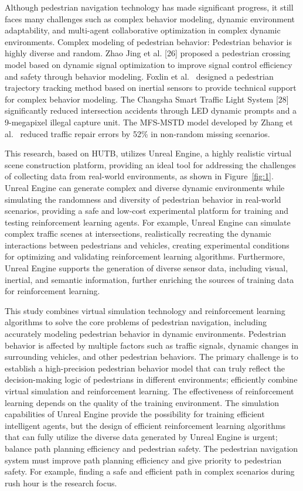 \documentclass[lettersize,journal]{IEEEtran}
\begin{document}
Although pedestrian navigation technology has made significant progress, it still faces many challenges such as complex behavior modeling, dynamic environment adaptability, and multi-agent collaborative optimization in complex dynamic environments.
%
Complex modeling of pedestrian behavior: Pedestrian behavior is highly diverse and random. 
Zhao Jing et al. [26] proposed a pedestrian crossing model based on dynamic signal optimization to improve signal control efficiency and safety through behavior modeling. 
Foxlin et al.~\cite{foxlin2005pedestrian} designed a pedestrian trajectory tracking method based on inertial sensors to provide technical support for complex behavior modeling. 
The Changsha Smart Traffic Light System [28] significantly reduced intersection accidents through LED dynamic prompts and a 9-megapixel illegal capture unit. 
The MFS-MSTD model developed by Zhang et al.~\cite{jiyu2024joint} reduced traffic repair errors by 52\% in non-random missing scenarios.



This research, based on HUTB, utilizes Unreal Engine, a highly realistic virtual scene construction platform, providing an ideal tool for addressing the challenges of collecting data from real-world environments, as shown in Figure~\ref{fig:1}. 
Unreal Engine can generate complex and diverse dynamic environments while simulating the randomness and diversity of pedestrian behavior in real-world scenarios, providing a safe and low-cost experimental platform for training and testing reinforcement learning agents. 
For example, Unreal Engine can simulate complex traffic scenes at intersections, realistically recreating the dynamic interactions between pedestrians and vehicles, creating experimental conditions for optimizing and validating reinforcement learning algorithms. 
Furthermore, Unreal Engine supports the generation of diverse sensor data, including visual, inertial, and semantic information, further enriching the sources of training data for reinforcement learning.


This study combines virtual simulation technology and reinforcement learning algorithms to solve the core problems of pedestrian navigation, including accurately modeling pedestrian behavior in dynamic environments. 
Pedestrian behavior is affected by multiple factors such as traffic signals, dynamic changes in surrounding vehicles, and other pedestrian behaviors. 
The primary challenge is to establish a high-precision pedestrian behavior model that can truly reflect the decision-making logic of pedestrians in different environments; 
efficiently combine virtual simulation and reinforcement learning. 
The effectiveness of reinforcement learning depends on the quality of the training environment. 
The simulation capabilities of Unreal Engine provide the possibility for training efficient intelligent agents, but the design of efficient reinforcement learning algorithms that can fully utilize the diverse data generated by Unreal Engine is urgent; 
balance path planning efficiency and pedestrian safety. 
The pedestrian navigation system must improve path planning efficiency and give priority to pedestrian safety. 
For example, finding a safe and efficient path in complex scenarios during rush hour is the research focus.
\end{document}
